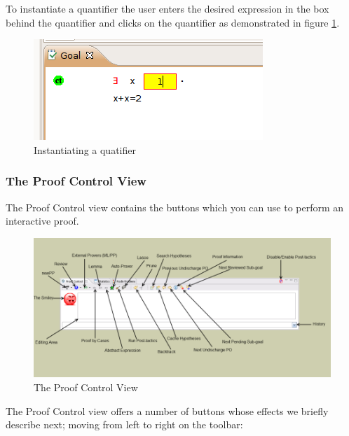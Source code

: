 To instantiate a quantifier the user enters the desired expression in the box behind the quantifier and clicks on the quantifier as demonstrated in figure \ref{fig_ref_01_proving_perspective5}.

\begin{figure}[!h]
\begin{center}
	\includegraphics{img/reference/ref_01_proving_perspective5.png}
	\caption{Instantiating a quatifier}
	\label{fig_ref_01_proving_perspective5}
\end{center}
\end{figure}

\subsubsection{The Proof Control View}

The \textsf{Proof Control view} contains the buttons which you can use to perform an interactive proof. 

\begin{figure}[!h]
\begin{center}
	\includegraphics{img/reference/ref_01_proving_perspective6.png}
	\caption{The Proof Control View}
	\label{fig_ref_01_proving_perspective6}
\end{center}
\end{figure}

The Proof Control view offers a number of buttons whose effects we briefly describe next; moving from left to right on the toolbar:

